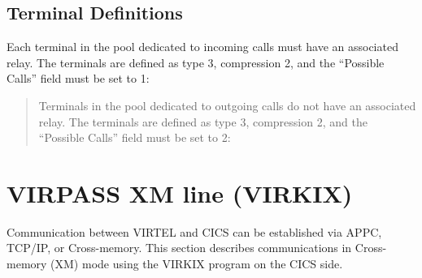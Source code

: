 \documentclass[letterpaper,10pt,english]{sphinxmanual}
\begin{document}
\ignorespaces 

\subsection{Terminal Definitions}
\label{\detokenize{connectivity_guide:index-47}}\label{\detokenize{connectivity_guide:id19}}
Each terminal in the pool dedicated to incoming calls must have an associated relay. The terminals are defined as type 3, compression 2, and the “Possible Calls” field must be set to 1:

\begin{quote}

Terminals in the pool dedicated to outgoing calls do not have an associated relay. The terminals are defined as type 3, compression 2, and the “Possible Calls” field must be set to 2:
\end{quote}


\newpage

\ignorespaces 

\section{VIRPASS XM line (VIRKIX)}
\label{\detokenize{connectivity_guide:virpass-xm-line-virkix}}\label{\detokenize{connectivity_guide:index-48}}
Communication between VIRTEL and CICS can be established via APPC, TCP/IP, or Cross-memory. This section describes communications in Cross-memory (XM) mode using the VIRKIX program on the CICS side.


\ignorespaces 
\end{document}
